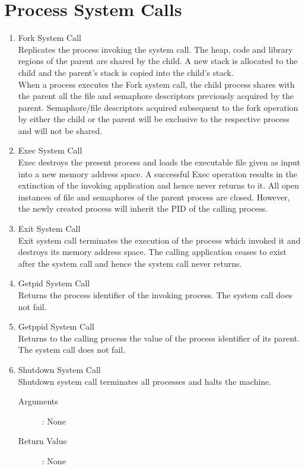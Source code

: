 \section{Process System Calls}
\begin{enumerate}
\item{Fork System Call}
\\
Replicates the process invoking the system call. The heap, code and library regions of the parent are shared by the child. A new stack is allocated to the child and the parent's stack is copied into the child's stack.
\\
When a process executes the Fork system call, the child process shares with the parent all the file and semaphore descriptors previously acquired by the parent. Semaphore/file descriptors acquired subsequent to the fork operation by either the child or the parent will be exclusive to the respective process and will not be shared.
 

\item{Exec System Call}
\\
Exec destroys the present process and loads the executable file given as input into a new memory address space. A successful Exec operation results in the extinction of the invoking application and hence never returns to it. All open instances of file and semaphores of the parent process are closed. However, the newly created process will inherit the PID of the calling process.


\item{Exit System Call}
\vspace{2mm}\\
 Exit system call terminates the execution of the process which invoked it and destroys its memory address space. The calling application ceases to exist after the system call and hence the system call never returns.


\item{Getpid System Call}\\
 Returns the process identifier of the invoking process. The system call does not fail.


\item{Getppid System Call}\\
 Returns to the calling process the value of the process identifier of its parent. The system call does not fail.


\item{Shutdown System Call}
\\
Shutdown system call terminates all processes and halts the machine. \begin{description}
\item[Arguments]: None
\item[Return Value]: None
\end{description} 
\end{enumerate}

